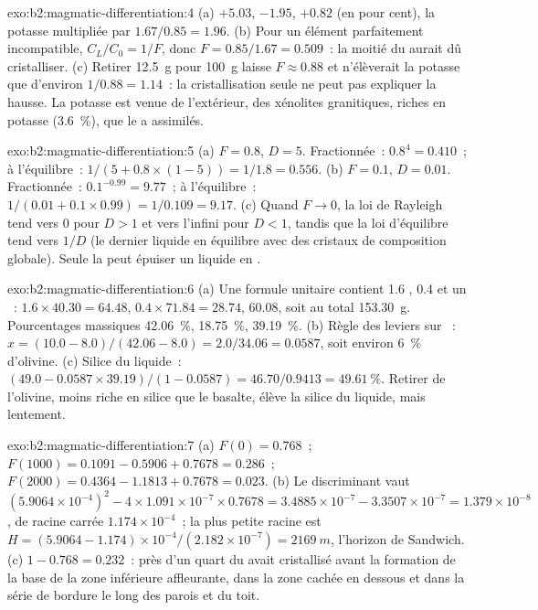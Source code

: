 \begin{solution}{exo:b2:magmatic-differentiation:4}
(a)  $+5.03$,  $-1.95$,  $+0.82$ (en pour cent), la potasse
multipliée par $1.67/0.85 = 1.96$. (b) Pour un élément parfaitement incompatible,
$C_L/C_0 = 1/F$, donc $F = 0.85/1.67 = 0.509$~: la moitié du  aurait dû cristalliser.
(c) Retirer \qty{12.5}{g} pour \qty{100}{g} laisse $F \approx 0.88$ et
n'élèverait la potasse que d'environ $1/0.88 = 1.14$~: la cristallisation seule ne peut pas
expliquer la hausse. La potasse est venue de l'extérieur, des xénolites granitiques, riches en
potasse (\qty{3.6}{\percent}), que le  a assimilés.
\end{solution}

\begin{solution}{exo:b2:magmatic-differentiation:5}
(a) $F = 0.8$, $D = 5$. Fractionnée~: $0.8^{4} = 0.410$~; à l'équilibre~:
$1/(5 + 0.8\times(1 - 5)) = 1/1.8 = 0.556$. (b) $F = 0.1$, $D = 0.01$. Fractionnée~:
$0.1^{-0.99} = 9.77$~; à l'équilibre~: $1/(0.01 + 0.1\times0.99) = 1/0.109 = 9.17$.
(c) Quand $F \to 0$, la loi de Rayleigh tend vers $0$ pour $D > 1$ et vers l'infini pour
$D < 1$, tandis que la loi d'équilibre tend vers $1/D$ (le dernier liquide en équilibre
avec des cristaux de composition globale). Seule la  peut épuiser
un liquide en .
\end{solution}

\begin{solution}{exo:b2:magmatic-differentiation:6}
(a) Une formule unitaire contient 1.6 , 0.4  et un ~: $1.6\times
40.30 = 64.48$, $0.4\times71.84 = 28.74$, 60.08, soit au total \qty{153.30}{g}. Pourcentages
massiques  \qty{42.06}{\percent},  \qty{18.75}{\percent},
 \qty{39.19}{\percent}. (b) Règle des leviers sur ~: $x = (10.0 - 8.0)/(42.06
- 8.0) = 2.0/34.06 = 0.0587$, soit environ \qty{6}{\percent} d'olivine. (c) Silice du
liquide~: $(49.0 - 0.0587\times39.19)/(1 - 0.0587) = 46.70/0.9413 =
\qty{49.61}{\percent}$. Retirer de l'olivine, moins riche en silice que le basalte,
élève la silice du liquide, mais lentement.
\end{solution}

\begin{solution}{exo:b2:magmatic-differentiation:7}
(a) $F(0) = 0.768$~; $F(1000) = 0.1091 - 0.5906 + 0.7678 = 0.286$~; $F(2000) = 0.4364
- 1.1813 + 0.7678 = 0.023$. (b) Le discriminant vaut $(5.9064\times10^{-4})^2 -
4\times1.091\times10^{-7}\times0.7678 = 3.4885\times10^{-7} - 3.3507\times10^{-7} =
1.379\times10^{-8}$, de racine carrée $1.174\times10^{-4}$~; la plus petite racine est
$H = (5.9064 - 1.174)\times10^{-4}/(2.182\times10^{-7}) = \qty{2169}{m}$, l'horizon de
Sandwich. (c) $1 - 0.768 = 0.232$~: près d'un quart du  avait cristallisé
avant la formation de la base de la zone inférieure affleurante, dans la zone cachée
en dessous et dans la série de bordure le long des parois et du toit.
\end{solution}

